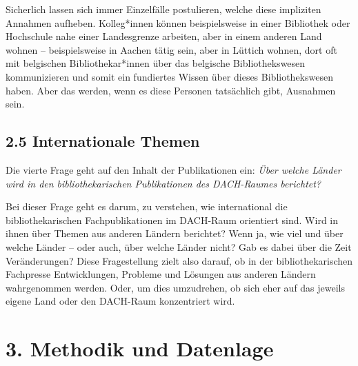\documentclass[a4paper,
fontsize=11pt,
oneside,
numbers=noperiodatend,
parskip=half-,
bibliography=totoc,
final
]{scrartcl}
\begin{document}
Sicherlich lassen sich immer Einzelfälle postulieren, welche diese
impliziten Annahmen aufheben. Kolleg*innen können beispielsweise in
einer Bibliothek oder Hochschule nahe einer Landesgrenze arbeiten, aber
in einem anderen Land wohnen -- beispielsweise in Aachen tätig sein,
aber in Lüttich wohnen, dort oft mit belgischen Bibliothekar*innen über
das belgische Bibliothekswesen kommunizieren und somit ein fundiertes
Wissen über dieses Bibliothekswesen haben. Aber das werden, wenn es
diese Personen tatsächlich gibt, Ausnahmen sein.

\hypertarget{internationale-themen}{%
\subsection{2.5 Internationale Themen}\label{internationale-themen}}

Die vierte Frage geht auf den Inhalt der Publikationen ein: \emph{Über
welche Länder wird in den bibliothekarischen Publikationen des
DACH-Raumes berichtet?}

Bei dieser Frage geht es darum, zu verstehen, wie international die
bibliothekarischen Fachpublikationen im DACH-Raum orientiert sind. Wird
in ihnen über Themen aus anderen Ländern berichtet? Wenn ja, wie viel
und über welche Länder -- oder auch, über welche Länder nicht? Gab es
dabei über die Zeit Veränderungen? Diese Fragestellung zielt also
darauf, ob in der bibliothekarischen Fachpresse Entwicklungen, Probleme
und Lösungen aus anderen Ländern wahrgenommen werden. Oder, um dies
umzudrehen, ob sich eher auf das jeweils eigene Land oder den DACH-Raum
konzentriert wird.

\hypertarget{methodik-und-datenlage}{%
\section{3. Methodik und Datenlage}\label{methodik-und-datenlage}}
\end{document}
